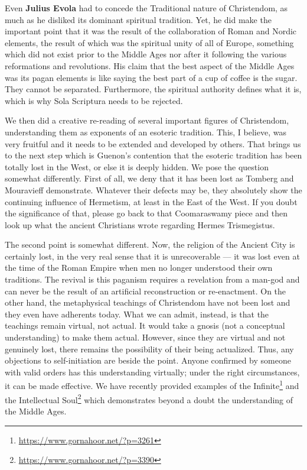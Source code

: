 Even \textbf{Julius Evola} had to concede the Traditional nature of Christendom, as much as he disliked its dominant spiritual tradition. Yet, he did make the important point that it was the result of the collaboration of Roman and Nordic elements, the result of which was the spiritual unity of all of Europe, something which did not exist prior to the Middle Ages nor after it following the various reformations and revolutions. His claim that the best aspect of the Middle Ages was its pagan elements is like saying the best part of a cup of coffee is the sugar. They cannot be separated. Furthermore, the spiritual authority defines what it is, which is why Sola Scriptura needs to be rejected.

We then did a creative re-reading of several important figures of Christendom, understanding them as exponents of an esoteric tradition. This, I believe, was very fruitful and it needs to be extended and developed by others. That brings us to the next step which is Guenon's contention that the esoteric tradition has been totally lost in the West, or else it is deeply hidden. We pose the question somewhat differently. First of all, we deny that it has been lost as Tomberg and Mouravieff demonstrate. Whatever their defects may be, they absolutely show the continuing influence of Hermetism, at least in the East of the West. If you doubt the significance of that, please go back to that Coomaraswamy piece and then look up what the ancient Christians wrote regarding Hermes Trismegistus.

The second point is somewhat different. Now, the religion of the Ancient City is certainly lost, in the very real sense that it is unrecoverable — it was lost even at the time of the Roman Empire when men no longer understood their own traditions. The revival is this paganism requires a revelation from a man-god and can never be the result of an artificial reconstruction or re-enactment. On the other hand, the metaphysical teachings of Christendom have not been lost and they even have adherents today. What we can admit, instead, is that the teachings remain virtual, not actual. It would take a gnosis (not a conceptual understanding) to make them actual. However, since they are virtual and not genuinely lost, there remains the possibility of their being actualized. Thus, any objections to self-initiation are beside the point. Anyone confirmed by someone with valid orders has this understanding virtually; under the right circumstances, it can be made effective. We have recently provided examples of the Infinite\footnote{\url{https://www.gornahoor.net/?p=3261}} and the Intellectual Soul\footnote{\url{https://www.gornahoor.net/?p=3390}} which demonstrates beyond a doubt the understanding of the Middle Ages.


